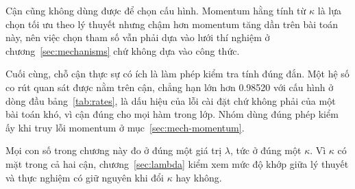 Cận cũng không dùng được để chọn cấu hình. Momentum hằng tính từ $\kappa$ là lựa
chọn tối ưu theo lý thuyết nhưng chậm hơn momentum tăng dần trên bài toán này,
nên việc chọn tham số vẫn phải dựa vào lưới thí nghiệm ở
chương~\ref{sec:mechanisms} chứ không dựa vào công thức.

Cuối cùng, chỗ cận thực sự có ích là làm phép kiểm tra tính đúng đắn. Một hệ số
co rút quan sát được nằm trên cận, chẳng hạn lớn hơn \num{0.98520} với cấu hình ở
dòng đầu bảng~\ref{tab:rates}, là dấu hiệu của lỗi cài đặt chứ không phải của một
bài toán khó, vì cận đúng cho mọi hàm trong lớp. Nhóm dùng đúng phép kiểm ấy khi
truy lỗi momentum ở mục~\ref{sec:mech-momentum}.

Mọi con số trong chương này đo ở đúng một giá trị $\lambda$, tức ở đúng một
$\kappa$. Vì $\kappa$ có mặt trong cả hai cận, chương~\ref{sec:lambda} kiểm xem
mức độ khớp giữa lý thuyết và thực nghiệm có giữ nguyên khi đổi $\kappa$ hay
không.
